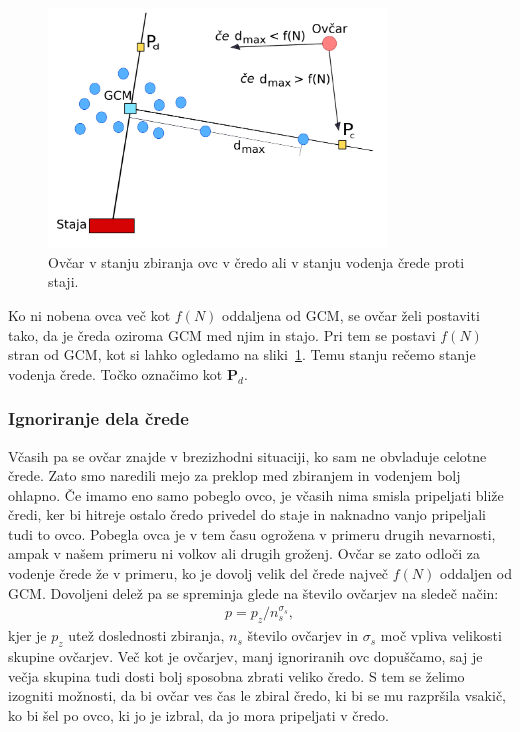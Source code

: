 \begin{figure}[ht]  %
	\centering
	\includegraphics[width=0.8\textwidth]{../poglavja/images/zbiranje.pdf}
	\caption[Stanje zbiranja in vodenja črede]{Ovčar v stanju zbiranja ovc v čredo ali v stanju vodenja črede proti staji.} %
	\label{fig:zbiranje}
\end{figure}

Ko ni nobena ovca več kot $f(N)$ oddaljena od GCM, se ovčar želi postaviti tako, da je čreda oziroma GCM med njim in stajo. Pri tem se postavi $f(N)$ stran od GCM, kot si lahko ogledamo na sliki~\ref{fig:zbiranje}. Temu stanju rečemo stanje vodenja črede. Točko označimo kot $\mathbf{P}_d$.

\subsubsection{Ignoriranje dela črede}

Včasih pa se ovčar znajde v brezizhodni situaciji, ko sam ne obvladuje celotne črede. Zato smo naredili mejo za preklop med zbiranjem in vodenjem bolj ohlapno. Če imamo eno samo pobeglo ovco, je včasih nima smisla pripeljati bliže čredi, ker bi hitreje ostalo čredo privedel do staje in naknadno vanjo pripeljali tudi to ovco. Pobegla ovca je v tem času ogrožena v primeru drugih nevarnosti, ampak v našem primeru ni volkov ali drugih groženj. Ovčar se zato odloči za vodenje črede že v primeru, ko je dovolj velik del črede največ $f(N)$ oddaljen od GCM. Dovoljeni delež pa se spreminja glede na število ovčarjev na sledeč način:
\begin{align}
p = p_z / n_s^{\sigma_s}, \label{eq:ignoriranje}
\end{align}
kjer je $p_z$ utež doslednosti zbiranja, $n_s$ število ovčarjev in $\sigma_s$ moč vpliva velikosti skupine ovčarjev. Več kot je ovčarjev, manj ignoriranih ovc dopuščamo, saj je večja skupina tudi dosti bolj sposobna zbrati veliko čredo. S tem se želimo izogniti možnosti, da bi ovčar ves čas le zbiral čredo, ki bi se mu razpršila vsakič, ko bi šel po ovco, ki jo je izbral, da jo mora pripeljati v čredo.

